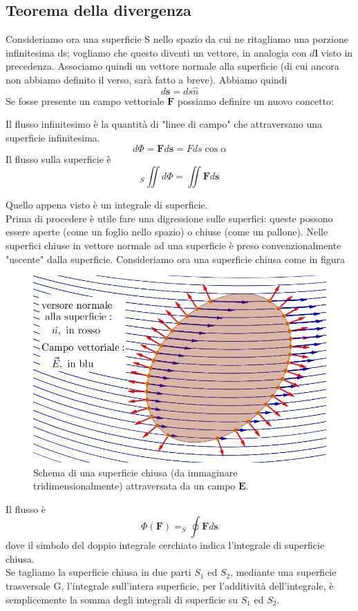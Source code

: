 \documentclass[
10pt, %
a4paper, %
oneside, %
headinclude,footinclude, %
BCOR5mm, %
]{scrartcl}
\begin{document}
\subsection{Teorema della divergenza}\label{ap:thm_divergenza}
Consideriamo ora una superficie S nello spazio da cui ne ritagliamo una porzione infinitesima ds; vogliamo che questo diventi un vettore, in analogia con $d\mathbf{l}$ visto in precedenza. Associamo quindi un vettore normale alla superficie (di cui ancora non abbiamo definito il verso, sarà fatto a breve). Abbiamo quindi
\[d\mathbf{s} = ds \hat{n}\]
Se fosse presente un campo vettoriale $\mathbf{F}$ possiamo definire un nuovo concetto:
\begin{definizione}[Flusso]
	Il flusso infinitesimo è la quantità di "linee di campo" che attraversano una superficie infinitesima. 
	\[d\Phi = \mathbf{F}d\mathbf{s} = Fds\cos\alpha\]
	Il flusso sulla superficie è 
	\[_S\iint d\Phi = \iint \mathbf{F}d\mathbf{s}\]
\end{definizione}
Quello appena visto è un integrale di superficie.\\
Prima di procedere è utile fare una digressione sulle superfici: queste possono essere aperte (come un foglio nello spazio) o chiuse (come un pallone). Nelle superfici chiuse in vettore normale ad una superficie è preso convenzionalmente "uscente" dalla superficie. Consideriamo ora una superficie chiusa come in figura
\begin{figure}[h!]
	\centering
	\includegraphics[width=0.6\linewidth]{images/flusso2bis}
	\caption{Schema di una superficie chiusa (da immaginare tridimensionalmente) attraversata da un campo \(\mathbf{E}\).}
	\label{fig:flusso2bis}
\end{figure}
\FloatBarrier
Il flusso è 
\[\Phi(\mathbf{F}) = _S\oint \mathbf{F}d\mathbf{s}\]
dove il simbolo del doppio integrale cerchiato indica l'integrale di superficie chiusa.\\
Se tagliamo la superficie chiusa in due parti \(S_1\) ed \(S_2\), mediante una superficie trasversale G, l'integrale sull'intera superficie, per l'additività dell'integrale, è semplicemente la somma degli integrali di superficie su \(S_1\) ed \(S_2\).
\end{document}
